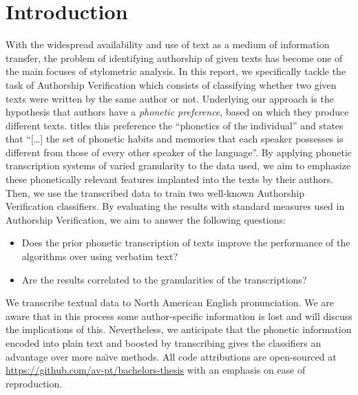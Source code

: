 \chapter{Introduction}\label{introduction}
With the widespread availability and use of text as a medium of information transfer, the problem of identifying authorship of given texts has become one of the main focuses of stylometric analysis.
In this report, we specifically tackle the task of Authorship Verification which consists of classifying whether two given texts were written by the same author or not.
Underlying our approach is the hypothesis that authors have a \textit{phonetic preference}, based on which they produce different texts.
\cite{ladefoged2014courseInPhonetics} titles this preference the ``phonetics of the individual'' and states that ``[\ldots] the set of phonetic habits and memories that each speaker possesses is different from those of every other speaker of the language''.
By applying phonetic transcription systems of varied granularity to the data used, we aim to emphasize these phonetically relevant features implanted into the texts by their authors.
Then, we use the transcribed data to train two well-known Authorship Verification classifiers.
By evaluating the results with standard measures used in Authorship Verification, we aim to answer the following questions:
\begin{itemize}
  \item Does the prior phonetic transcription of texts improve the performance of the algorithms over using verbatim text?
  \item Are the results correlated to the granularities of the transcriptions?
\end{itemize}
We transcribe textual data to North American English pronunciation.
We are aware that in this process some author-specific information is lost and will discuss the implications of this.
Nevertheless, we anticipate that the phonetic information encoded into plain text and boosted by transcribing gives the classifiers an advantage over more na\"{\i}ve methods.
All code attributions are open-sourced at \url{https://github.com/av-pt/bachelors-thesis} with an emphasis on ease of reproduction.